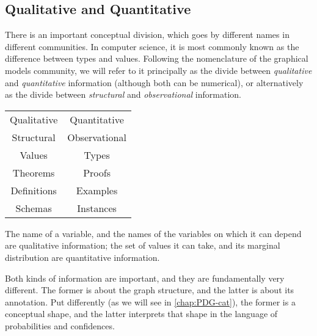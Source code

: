 
\subsection{Qualitative and Quantitative}


There is an important conceptual division,
which goes by different names in different communities. 
In computer science, it is most commonly known as the difference between types and values.
Following the nomenclature of the graphical models community, we will refer to it principally as the divide between \emph{qualitative} and \emph{quantitative} information (although both can be numerical), or alternatively as the divide between \emph{structural} and \emph{observational} information. 

\begin{center}
\begin{tabular}{c|c}
    Qualitative & Quantitative \\ 
    Structural & Observational \\
    Values & Types \\ 
    Theorems & Proofs \\
    Definitions & Examples \\
    Schemas & Instances 
\end{tabular}
\end{center}

The name of a variable, and the names of the variables on which it can depend are qualitative information; the set of values it can take, and its marginal distribution are quantitative information. 

Both kinds of information are important, and they are fundamentally very different. The former is about the graph structure, and the latter is about its annotation. Put differently (as we will see in \cref{chap:PDG-cat}), the former is a conceptual shape, and the latter interprets that shape in the language of probabilities and confidences. 

